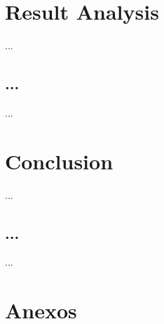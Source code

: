 \documentclass[a4paper]{article}
\begin{document}
\cleardoublepage

\section{Result Analysis}
\indent \indent ...

\cleardoublepage

\subsection{...}
\indent \indent ...

\cleardoublepage
\section{Conclusion}
\indent \indent ...

\cleardoublepage

\subsection{...}
\indent \indent ...

\eject \pdfpagewidth=594.0mm \pdfpageheight=420.0mm

\cleardoublepage
\section{Anexos}
\end{document}
